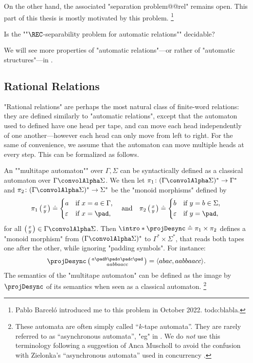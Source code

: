 On the other hand, the associated "separation problem@@rel" remains open.
This part of this thesis is mostly motivated by this problem.%
\footnote{Pablo Barceló introduced me to this problem in October 2022.
todo:blabla.}

\begin{openproblem}
	Is the ""$\REC$-separability problem for automatic relations"" decidable?
\end{openproblem}

We will see more properties of "automatic relations"---or rather of "automatic structures"---in
.

\subsection{Rational Relations}

"Rational relations" are perhaps the most natural class of finite-word relations:
they are defined similarly to "automatic relations", except that
the automaton used to defined have one head per tape, and can move each head
independently of one another---however each head can only move from left to right.
For the same of convenience, we assume that the automaton can move multiple heads at every step.
This can be formalized as follows.

An \AP""multitape automaton"" over $\Gamma,\Sigma$
can be syntactically defined as a classical automaton over $\Gamma \convolAlpha \Sigma$.
We then let $\pi_1\colon (\Gamma\convolAlpha\Sigma)^* \to \Gamma^*$ and 
$\pi_2\colon (\Gamma\convolAlpha\Sigma)^* \to \Sigma^*$ be the "monoid morphisms"
defined by
\[
	\pi_1\pair{x}{y}\defeq \begin{cases*}
		a & \text{if $x = a \in \Gamma$,}\\
		\varepsilon & \text{if $x=\pad$,}
	\end{cases*}
	\quad\text{and}\quad
	\pi_2\pair{x}{y}\defeq \begin{cases*}
		b & \text{if $y = b \in \Sigma$,}\\
		\varepsilon & \text{if $y=\pad$,}
	\end{cases*}
\]
for all $\pair{x}{y}\in \Gamma\convolAlpha\Sigma$.
Then \AP$\intro*\projDesync \defeq \pi_1 \times \pi_2$ defines a "monoid morphism" 
from $(\Gamma\convolAlpha\Sigma)^*$ to $\Gamma^* \times \Sigma^*$,
that reads both tapes one after the other, while ignoring "padding symbols".
For instance:
\[
	\projDesync\pair{a \pad b \pad a \pad c \pad}{a a b b a a c c}
	= \tup{abac, aabbaacc}.
\]
The semantics of the "multitape automaton"
can be defined as the image by $\projDesync$ of its semantics when seen as a
classical automaton.%
\footnote[][-15em]{These automata are often simply called ``$k$-tape automata''. 
They are rarely referred to as ``asynchronous automata'',
"eg" in \cite[\S~3]{CarayolLoding2011Uniformization}.
We do \emph{not} use this terminology following a suggestion
of Anca Muscholl to avoid the confusion with Zielonka's ``asynchronous automata'' used in 
concurrency \cite[\S~4]{Zielonka1987AsynchronousAutomata}.}

